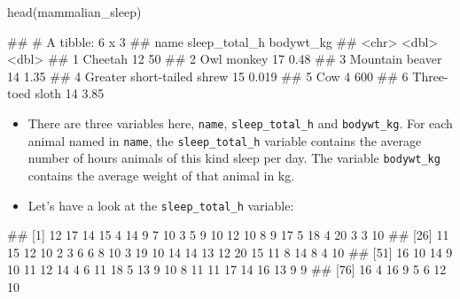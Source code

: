 \documentclass[
]{book}
\newenvironment{Shaded}{\begin{snugshade}}{\end{snugshade}}
\newcommand{\FunctionTok}[1]{\textcolor[rgb]{0.00,0.00,0.00}{#1}}
\newcommand{\NormalTok}[1]{#1}
\newcommand{\SpecialCharTok}[1]{\textcolor[rgb]{0.00,0.00,0.00}{#1}}
\begin{document}
\begin{Shaded}
\begin{Highlighting}[]
\FunctionTok{head}\NormalTok{(mammalian\_sleep)}
\end{Highlighting}
\end{Shaded}

\begin{Shaded}
\begin{Highlighting}[]
\NormalTok{\#\# \# A tibble: 6 x 3}
\NormalTok{\#\#   name                       sleep\_total\_h bodywt\_kg}
\NormalTok{\#\#   \textless{}chr\textgreater{}                              \textless{}dbl\textgreater{}     \textless{}dbl\textgreater{}}
\NormalTok{\#\# 1 Cheetah                               12    50    }
\NormalTok{\#\# 2 Owl monkey                            17     0.48 }
\NormalTok{\#\# 3 Mountain beaver                       14     1.35 }
\NormalTok{\#\# 4 Greater short{-}tailed shrew            15     0.019}
\NormalTok{\#\# 5 Cow                                    4   600    }
\NormalTok{\#\# 6 Three{-}toed sloth                      14     3.85}
\end{Highlighting}
\end{Shaded}

\begin{itemize}
\item
  There are three variables here, \texttt{name}, \texttt{sleep\_total\_h} and \texttt{bodywt\_kg}. For each animal named in \texttt{name}, the \texttt{sleep\_total\_h} variable contains the average number of hours animals of this kind sleep per day. The variable \texttt{bodywt\_kg} contains the average weight of that animal in kg.
\item
  Let's have a look at the \texttt{sleep\_total\_h} variable:
\end{itemize}

\begin{Shaded}
\end{Shaded}

\begin{Shaded}
\begin{Highlighting}[]
\NormalTok{\#\#  [1] 12 17 14 15  4 14  9  7 10  3  5  9 10 12 10  8  9 17  5 18  4 20  3  3 10}
\NormalTok{\#\# [26] 11 15 12 10  2  3  6  6  8 10  3 19 10 14 14 13 12 20 15 11  8 14  8  4 10}
\NormalTok{\#\# [51] 16 10 14  9 10 11 12 14  4  6 11 18  5 13  9 10  8 11 11 17 14 16 13  9  9}
\NormalTok{\#\# [76] 16  4 16  9  5  6 12 10}
\end{Highlighting}
\end{Shaded}
\end{document}
